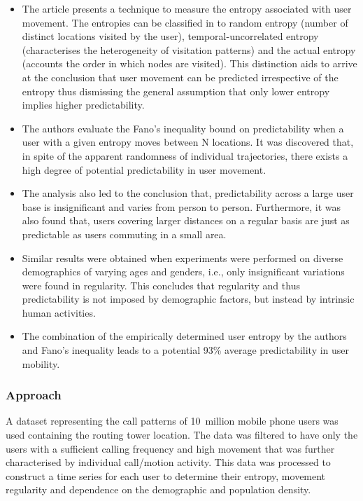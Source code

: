 \begin{itemize}

	\item The article presents a technique to measure the entropy associated with user movement. 
	The entropies can be classified in to random entropy (number of distinct locations visited by the user), 
	temporal-uncorrelated entropy (characterises the heterogeneity of visitation patterns) and the actual
	entropy (accounts the order in which nodes are visited). This distinction aids to arrive at the 
	conclusion that user movement can be predicted irrespective of the entropy thus dismissing the 
	general assumption that only lower entropy implies higher predictability. 
		
	\item The authors evaluate the Fano's inequality bound on predictability when a user with a given entropy 
	moves between N locations. It was discovered that, in spite of the apparent randomness of individual
	trajectories, there exists a high degree of potential predictability in user movement. 
	
	\item The analysis also led to the conclusion that, predictability across a large user base is insignificant 
	and varies from person to person. Furthermore, it was also found that, users covering larger distances on a 
	regular basis are just as predictable as users commuting in a small area. 
	
	\item Similar results were obtained when experiments were performed on diverse demographics of varying ages and 
	genders, i.e., only insignificant variations were found in regularity. This concludes that regularity and thus 
	predictability is not imposed by demographic factors, but instead by intrinsic human activities. 
	
	\item The combination of the empirically determined user entropy by the authors and Fano's inequality leads 
	to a potential 93\% average predictability in user mobility.
	
\end{itemize}

\subsubsection*{Approach}

A dataset representing the call patterns of 10~million mobile phone users was used containing the routing tower 
location. The data was filtered to have only the users with a sufficient calling frequency and high 
movement that was further characterised by individual call/motion activity. This data was processed to construct 
a time series for each user to determine their entropy, movement regularity and dependence on the demographic
and population density. 
 
